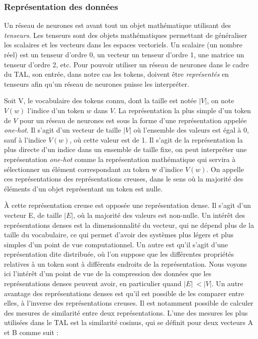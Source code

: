 \documentclass[12pt,a4paper,times,twoside,openright]{report}
\begin{document}
        
            \subsubsection{Représentation des données}
            \label{subsubsec:nn-embeddings}
Un réseau de neurones est avant tout un objet mathématique utilisant des \emph{tenseurs}. Les tenseurs sont des objets mathématiques permettant de généraliser les scalaires et les vecteurs dans les espaces vectoriels. Un scalaire (un nombre réel) est un tenseur d'ordre 0, un vecteur un tenseur d'ordre 1, une matrice un tenseur d'ordre 2, etc. Pour pouvoir utiliser un réseau de neurones dans le cadre du TAL, son entrée, dans notre cas les tokens, doivent être \emph{représentés} en tenseurs afin qu'un réseau de neurones puisse les interpréter.

Soit V, le vocabulaire des tokens connu, dont la taille est notée $|V|$, on note $V(w)$ l'indice d'un token $w$ dans $V$. La représentation la plus simple d'un token de $V$ pour un réseau de neurones est sous la forme d'une représentation appelée \textit{one-hot}. Il s'agit d'un vecteur de taille $|V|$ où l'ensemble des valeurs est égal à 0, sauf à l'indice $V(w)$, où cette valeur est de 1. Il s'agit de la représentation la plus directe d'un indice dans un ensemble de taille fixe, on peut interpréter une représentation \textit{one-hot} comme la représentation mathématique qui servira à sélectionner un élément correspondant au token w d'indice $V(w)$. On appelle ces représentations des représentations creuses, dans le sens où la majorité des éléments d'un objet représentant un token est nulle.

À cette représentation creuse est opposée une représentation dense. Il s'agit d'un vecteur E, de taille $|E|$, où la majorité des valeurs est non-nulle. Un intérêt des représentations denses est la dimensionnalité du vecteur, qui ne dépend plus de la taille du vocabulaire, ce qui permet d'avoir des systèmes plus légers et plus simples d'un point de vue computationnel. Un autre est qu'il s'agit d'une représentation dite distribuée, où l'on suppose que les différentes propriétés relatives à un token sont à différents endroits de la représentation. Nous voyons ici l'intérêt d'un point de vue de la compression des données que les représentations denses peuvent avoir, en particulier quand $|E|\ < |V|$. Un autre avantage des représentations denses est qu'il est possible de les comparer entre elles, à l'inverse des représentations creuses. Il est notamment possible de calculer des mesures de similarité entre deux représentations. L'une des mesures les plus utilisées dans le TAL est la similarité cosinus, qui se définit pour deux vecteurs A et B comme suit :
\end{document}
